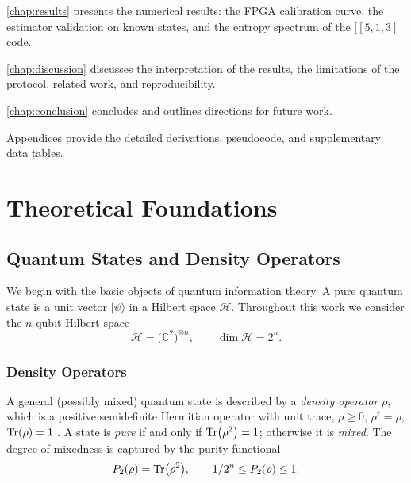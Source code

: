 \documentclass[12pt,a4paper,oneside]{book}
\theoremstyle{plain}
\theoremstyle{definition}
\theoremstyle{remark}
\begin{document}
\cref{chap:results} presents the numerical results: the FPGA calibration curve, the estimator validation on known states, and the entropy spectrum of the $[[5,1,3]$ code.

\cref{chap:discussion} discusses the interpretation of the results, the limitations of the protocol, related work, and reproducibility.

\cref{chap:conclusion} concludes and outlines directions for future work.

Appendices provide the detailed derivations, pseudocode, and supplementary data tables.

\chapter{Theoretical Foundations}
\label{chap:foundations}

\section{Quantum States and Density Operators}
\label{sec:quantum_states}

We begin with the basic objects of quantum information theory. A pure quantum state is a unit vector $|\psi\rangle$ in a Hilbert space $\mathcal{H}$. Throughout this work we consider the $n$-qubit Hilbert space
\begin{equation}
    \mathcal{H} = \bigl(\mathbb{C}^2\bigr)^{\otimes n}, \qquad \dim \mathcal{H} = 2^n.
\end{equation}

\subsection{Density Operators}

A general (possibly mixed) quantum state is described by a \emph{density operator} $\rho$, which is a positive semidefinite Hermitian operator with unit trace, $\rho \geq 0$, $\rho^\dagger = \rho$, $\Tr(\rho) = 1$ \cite{nielsen2010quantum}. A state is \emph{pure} if and only if $\Tr(\rho^2) = 1$; otherwise it is \emph{mixed}. The degree of mixedness is captured by the purity functional
\begin{equation}
    P_2(\rho) = \Tr(\rho^2), \qquad 1/2^{n} \leq P_2(\rho) \leq 1.
\end{equation}
\end{document}
